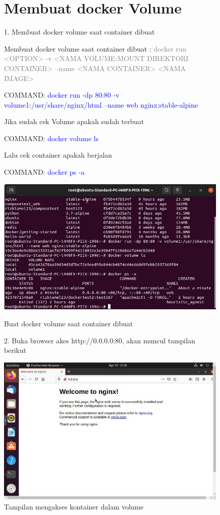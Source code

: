 \begin{figure}
    \section{Membuat docker Volume}
    1. Membuat docker volume saat container dibuat
    
    Membuat docker volume saat container dibuat : \textcolor{Gray}{docker run <OPTION> -v <NAMA VOLUME:MOUNT DIREKTORI CONTAINER> --name <NAMA CONTAINER> <NAMA IMAGE>}
    
    COMMAND: \textcolor{Blue}{docker run -dp 80:80 -v volume1:/usr/share/nginx/html --name web nginx:stable-alpine}
    
    Jika sudah cek Volume apakah sudah terbuat
    
    COMMAND: \textcolor{Blue}{docker volume ls}
    
    Lalu cek container apakah berjalan
    
    COMMAND: \textcolor{Blue}{docker ps -a}
    \begin{center}
        \includegraphics[width=\linewidth]{image/38.jpg}
        \caption{Buat docker volume saat container dibuat}
        \label{fig:my_figure}
    \end{center}

    2. Buka browser akes http://0.0.0.0:80, akan muncul tampilan berikut 
    \begin{center}
        \includegraphics[width=\linewidth]{image/39.jpg}
        \caption{Tampilan mengakses kontainer dalam volume}
        \label{fig:my_figure}
    \end{center}
\end{figure}
